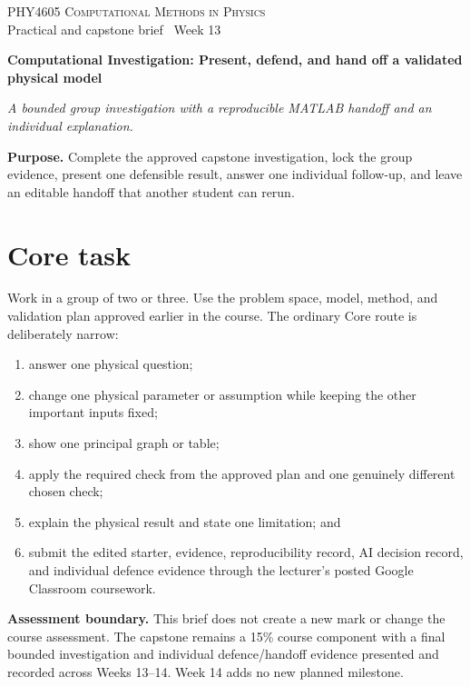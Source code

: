 \documentclass[11pt,a4paper]{article}
\newcommand{\course}{PHY4605 Computational Methods in Physics}
\begin{document}
{\large\textsc{\course}}\\[-2pt]
{\small Practical and capstone brief \textbar\ Week 13}\par\vspace{4pt}
{\LARGE\bfseries Computational Investigation: Present, defend, and hand off a validated physical model}\par\vspace{3pt}
\textit{A bounded group investigation with a reproducible MATLAB handoff and an individual explanation.}
\begin{keybox}\textbf{Purpose.} Complete the approved capstone investigation, lock the group evidence, present one defensible result, answer one individual follow-up, and leave an editable handoff that another student can rerun.\end{keybox}
\section*{Core task}
Work in a group of two or three. Use the problem space, model, method, and validation plan approved earlier in the course. The ordinary Core route is deliberately narrow:
\begin{enumerate}[nosep,leftmargin=6mm]
\item answer one physical question;
\item change one physical parameter or assumption while keeping the other important inputs fixed;
\item show one principal graph or table;
\item apply the required check from the approved plan and one genuinely different chosen check;
\item explain the physical result and state one limitation; and
\item submit the edited starter, evidence, reproducibility record, AI decision record, and individual defence evidence through the lecturer's posted Google Classroom coursework.
\end{enumerate}
\begin{aibox}\textbf{Assessment boundary.} This brief does not create a new mark or change the course assessment. The capstone remains a 15\% course component with a final bounded investigation and individual defence/handoff evidence presented and recorded across Weeks 13–14. Week 14 adds no new planned milestone.\end{aibox}
\end{document}
